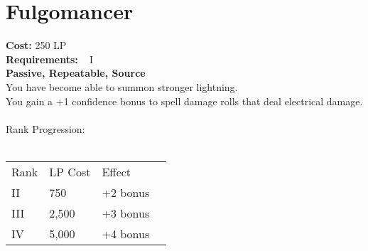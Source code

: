 \section{Fulgomancer}\label{perk:fulgomancer}
\textbf{Cost:} 250 LP\\
\textbf{Requirements:} ~ I\\
\textbf{Passive, Repeatable, Source}\\
You have become able to summon stronger lightning.\\
You gain a +1 confidence bonus to spell damage rolls that deal electrical damage.\\
\\
Rank Progression:\\
\\
\begin{tabular}{l | l | l | l}
    Rank & LP Cost &  Effect\\
    II & 750 & +2 bonus\\
    III & 2,500 & +3 bonus\\
    IV & 5,000 & +4 bonus\\
\end{tabular}